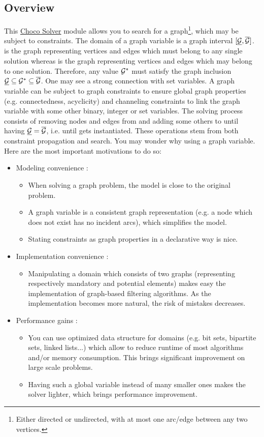 \documentclass{article}
\begin{document}
\subsection{Overview}

This \href{http://www.choco-solver.org/}{Choco Solver} module allows you to search for a graph\footnote{Either directed or undirected, with at most one arc/edge between any two vertices. }, which may be subject to constraints. 
%
The domain of a graph variable \GV{} is a graph interval $[\underline{\mathcal{G}}{},\overline{\mathcal{G}}{}]$. \GLB{} is the graph representing vertices and edges which must belong to any single solution whereas \GUB{} is the graph representing vertices and edges which may belong to one solution. Therefore, any value $\mathcal{G}{}^*$ must satisfy the graph inclusion $\underline{\mathcal{G}}{} \subseteq \mathcal{G}{}^* \subseteq \overline{\mathcal{G}}{}$. One may see a strong connection with set variables.
%
A graph variable can be subject to graph constraints to ensure global graph properties (e.g. connectedness, acyclicity) and channeling constraints to link the graph variable with some other binary, integer or set variables. 
%
The solving process consists of removing nodes and edges from \GUB{} and adding some others to \GLB{} until having $\underline{\mathcal{G}}{} = \overline{\mathcal{G}}{}$, i.e. until \GV{} gets instantiated. These operations stem from both constraint propagation and search. You may wonder why using a graph variable. Here are the most important motivations to do so:
\begin{itemize}
\item Modeling convenience : 
\begin{itemize}
\item When solving a graph problem, the model is close to the original problem. 
\item A graph variable is a consistent graph representation (e.g. a node which does not exist has no incident arcs), which simplifies the model. 
\item Stating constraints as graph properties in a declarative way is nice. 
\end{itemize}
\item Implementation convenience : 
\begin{itemize}
\item Manipulating a domain which consists of two graphs (representing respectively mandatory and potential elements) makes easy the implementation of graph-based filtering algorithms. As the implementation becomes more natural, the risk of mistakes decreases.
\end{itemize}
\item Performance gains : 
\begin{itemize}
\item You can use optimized data structure for domains (e.g. bit sets, bipartite sets, linked lists...) which allow to reduce runtime of most algorithms and/or memory consumption. This brings significant improvement on large scale problems. 
\item Having such a global variable instead of many smaller ones makes the solver lighter, which brings performance improvement.
\end{itemize}
\end{itemize}
\end{document}
